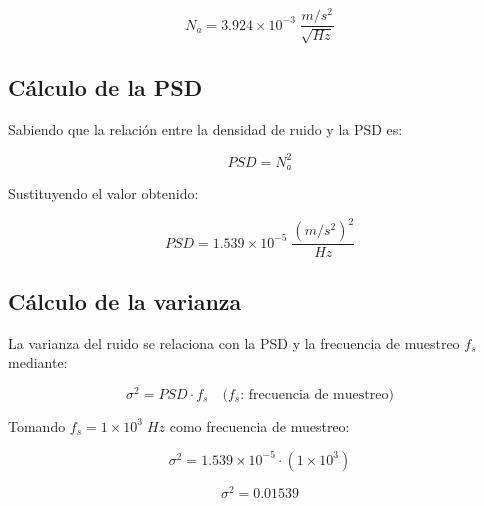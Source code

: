 \documentclass[12pt]{article}
\begin{document}
\begin{equation}
    N_a = 3.924 \times 10^{-3} \; \dfrac{m/s^2}{\sqrt{Hz}}
\end{equation}
 
\subsection{Cálculo de la PSD}
 
Sabiendo que la relación entre la densidad de ruido y la PSD es:
 
\begin{equation}
    PSD = N_a^2
\end{equation}
 
Sustituyendo el valor obtenido:
 
\begin{equation}
    PSD = 1.539 \times 10^{-5} \; \dfrac{(m/s^2)^2}{Hz}
\end{equation}
 
\subsection{Cálculo de la varianza}
 
La varianza del ruido se relaciona con la PSD y la frecuencia de muestreo $f_s$ mediante:
 
\begin{equation}
    \sigma^2 = PSD \cdot f_s \quad \text{(} f_s \text{: frecuencia de muestreo)}
\end{equation}
 
Tomando $f_s = 1 \times 10^{3} \; Hz$ como frecuencia de muestreo:
 
\begin{equation}
    \sigma^2 = 1.539 \times 10^{-5} \cdot (1 \times 10^{3})
\end{equation}
 
\begin{equation}
    \boxed{\sigma^2 = 0.01539}
\end{equation}
 
\end{document}
